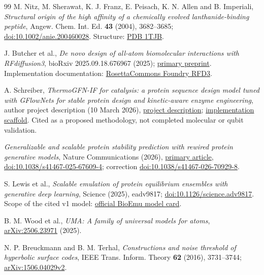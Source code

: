 \documentclass[11pt,oneside,openany]{book}
\theoremstyle{definition}\newtheorem{definition}[theorem]{Definition}
\theoremstyle{remark}\newtheorem{remark}[theorem]{Remark}
\begin{document}
\begin{thebibliography}{99}
M. Nitz, M. Sherawat, K. J. Franz, E. Peisach, K. N. Allen and B. Imperiali,
\emph{Structural origin of the high affinity of a chemically evolved
lanthanide-binding peptide}, Angew. Chem. Int. Ed. \textbf{43} (2004),
3682--3685; \href{https://doi.org/10.1002/anie.200460028}{doi:10.1002/anie.200460028}.
Structure: \href{https://www.rcsb.org/structure/1TJB}{PDB 1TJB}.

J. Butcher et al., \emph{De novo design of all-atom biomolecular interactions
with RFdiffusion3}, bioRxiv 2025.09.18.676967 (2025);
\href{https://pmc.ncbi.nlm.nih.gov/articles/PMC12458353/}{primary preprint}.
Implementation documentation:
\href{https://github.com/RosettaCommons/foundry/blob/production/models/rfd3/README.md}{RosettaCommons Foundry RFD3}.

A. Schreiber, \emph{ThermoGFN-IF for catalysis: a protein sequence design model
tuned with GFlowNets for stable protein design and kinetic-aware enzyme
engineering}, author project description (10 March 2026),
\href{https://huggingface.co/blog/AmelieSchreiber/thermogfn-if}{project description};
\href{https://github.com/amelie-iska/ThermoGFN-IF}{implementation scaffold}.
Cited as a proposed methodology, not completed molecular or qubit validation.

\emph{Generalizable and scalable protein stability prediction with rewired
protein generative models}, Nature Communications (2026),
\href{https://pmc.ncbi.nlm.nih.gov/articles/PMC12830971/}{primary article},
\href{https://doi.org/10.1038/s41467-025-67609-4}{doi:10.1038/s41467-025-67609-4};
correction \href{https://doi.org/10.1038/s41467-026-70929-8}{doi:10.1038/s41467-026-70929-8}.

S. Lewis et al., \emph{Scalable emulation of protein equilibrium ensembles
with generative deep learning}, Science (2025), eadv9817;
\href{https://doi.org/10.1126/science.adv9817}{doi:10.1126/science.adv9817}.
Scope of the cited v1 model:
\href{https://github.com/microsoft/bioemu/blob/main/MODEL_CARD.md}{official BioEmu model card}.

B. M. Wood et al., \emph{UMA: A family of universal models for atoms},
\href{https://arxiv.org/abs/2506.23971}{arXiv:2506.23971} (2025).

N. P. Breuckmann and B. M. Terhal, \emph{Constructions and noise threshold
of hyperbolic surface codes}, IEEE Trans. Inform. Theory \textbf{62} (2016),
3731--3744; \href{https://arxiv.org/abs/1506.04029v2}{arXiv:1506.04029v2}.


\end{thebibliography}
\end{document}
